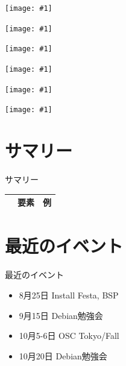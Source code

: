 \documentclass[cjk,dvipdfmx,12pt]{beamer}
\begin{document}
\newcommand{\graphicspage}[1]
{
\begin{frame}{}
 \texttt{[image: \#1]}
\end{frame}
}

\graphicspage{image200708/kfreebsd-install-0.png}
\graphicspage{image200708/kfreebsd-install-1.png}
\graphicspage{image200708/kfreebsd-install-2.png}
\graphicspage{image200708/kfreebsd-install-3.png}
\graphicspage{image200708/kfreebsd-install-4.png}
\graphicspage{image200708/kfreebsd-install-5.png}


\section{サマリー}

\begin{frame}{サマリー}

\begin{tabularx}{\hsize}{|l|X|X|}
\hline
 & 要素 & 例 \\
\hline
\hline
\end{tabularx}
\end{frame}

\section{最近のイベント}
\begin{frame}{最近のイベント}
\begin{itemize}
 \item 8月25日 Install Festa, BSP
 \item 9月15日 Debian勉強会
 \item 10月5-6日 OSC Tokyo/Fall
 \item 10月20日 Debian勉強会
\end{itemize}
\end{frame}
\end{document}
